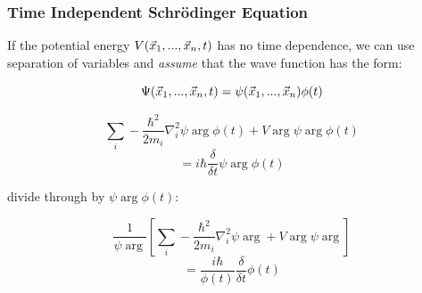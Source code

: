 \documentclass{beamer}
\begin{document}

\begin{frame}
\frametitle{Time Independent Schr\"odinger Equation}
If the potential energy $V(\vec{x}_1,...,\vec{x}_n,t)$ has no time dependence, we can 
use separation of variables and {\it assume} that the wave function has the form:

\[ \Psi(\vec{x}_1,...,\vec{x}_n,t) = \psi(\vec{x}_1,...,\vec{x}_n)\phi(t) \]

\[\sum_i - \frac{\hbar^2}{2m_i}\nabla_i^2 \psi\arg\phi(t) + V\arg\psi\arg\phi(t) \]
\[ = i \hbar\frac{\delta}{\delta t} \psi\arg\phi(t) \]

divide through by $\psi\arg\phi(t)$:

\[ \frac{1}{\psi\arg} \left[ \sum_i - \frac{\hbar^2}{2m_i}\nabla_i^2 \psi\arg + V\arg\psi\arg \right] \]
\[ = \frac{i\hbar}{\phi(t)} \frac{\delta}{\delta t} \phi(t) \]

\end{frame}
\end{document}
